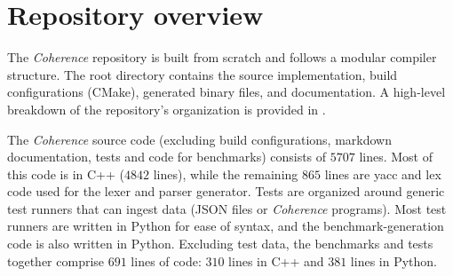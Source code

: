 \section{Repository overview} \label{sec:repository_overview}
The \textit{Coherence} repository is built from scratch and follows a modular compiler structure. The root directory contains the source implementation, build configurations (CMake), generated binary files, and documentation. A high-level breakdown of the repository's organization is provided in .

The \textit{Coherence} source code (excluding build configurations, markdown documentation, tests and code for benchmarks) consists of $5707$ lines. Most of this code is in C++ ($4842$ lines), while the remaining $865$ lines are yacc and lex code used for the lexer and parser generator. Tests are organized around generic test runners that can ingest data (JSON files or \textit{Coherence} programs). Most test runners are written in Python for ease of syntax, and the benchmark-generation code is also written in Python. Excluding test data, the benchmarks and tests together comprise $691$ lines of code: $310$ lines in C++ and $381$ lines in Python.

